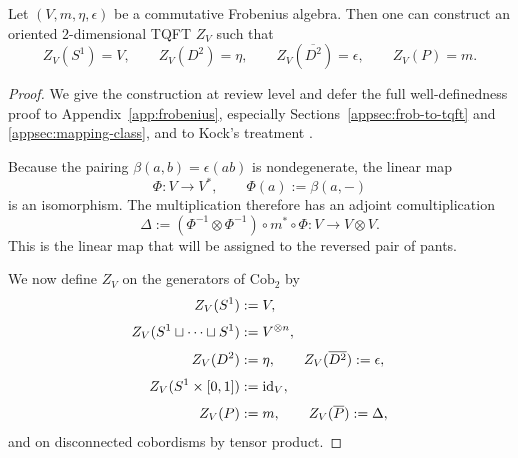 \begin{proposition}\label{prop:Frob-to-TQFT}
Let $(V,m,\eta,\epsilon)$ be a commutative Frobenius algebra. Then one can construct an oriented $2$-dimensional TQFT $Z_V$ such that
\begin{equation}\label{eq:recovered-data}
Z_V(S^1) = V,
\qquad
Z_V(D^2)=\eta,
\qquad
Z_V(\overline{D^2})=\epsilon,
\qquad
Z_V(P)=m.
\end{equation}
\end{proposition}

\begin{proof}
We give the construction at review level and defer the full well-definedness proof to Appendix~\ref{app:frobenius}, especially Sections~\ref{appsec:frob-to-tqft} and \ref{appsec:mapping-class}, and to Kock's treatment \cite[Chs.~1--2]{Kock2004Frobenius}.

\medskip

\noindent Because the pairing $\beta(a,b)=\epsilon(ab)$ is nondegenerate, the linear map
\begin{equation}\label{eq:Phi-map}
\Phi : V \longrightarrow V^*,
\qquad
\Phi(a) := \beta(a,-)
\end{equation}
is an isomorphism. The multiplication therefore has an adjoint comultiplication
\begin{equation}\label{eq:Delta-from-Phi}
\Delta := (\Phi^{-1} \otimes \Phi^{-1}) \circ m^* \circ \Phi : V \longrightarrow V \otimes V.
\end{equation}
This is the linear map that will be assigned to the reversed pair of pants.

\medskip

\noindent We now define $Z_V$ on the generators of $\mathrm{Cob}_2$ by
\begin{align}
Z_V(S^1) &:= V, \label{eq:ZV-circle} \\[1mm]
Z_V(S^1 \sqcup \cdots \sqcup S^1) &:= V^{\otimes n}, \label{eq:ZV-n-circles} \\[1mm]
Z_V(D^2) &:= \eta, \qquad Z_V(\overline{D^2}) := \epsilon, \label{eq:ZV-disks} \\[1mm]
Z_V(S^1 \times [0,1]) &:= \operatorname{id}_V, \label{eq:ZV-cylinder} \\[1mm]
Z_V(P) &:= m, \qquad Z_V(\overline{P}) := \Delta, \label{eq:ZV-pants}
\end{align}
and on disconnected cobordisms by tensor product.

\medskip


\end{proof}
